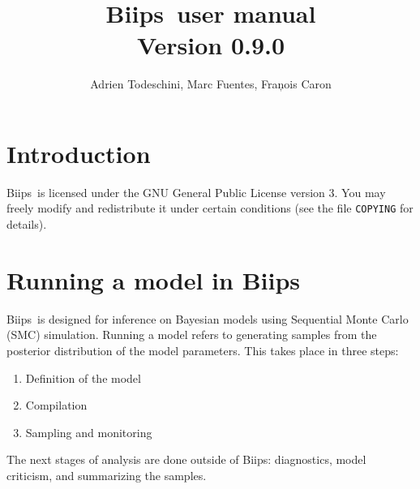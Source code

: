 \documentclass[11pt, a4paper, titlepage]{report}
\newcommand{\biips}{\textsf{Biips}}
\newcommand{\release}{0.9.0}
\newcommand{\JAGS}{\textsf{JAGS}}
\newcommand{\rjags}{\textsf{rjags}}
\newcommand{\OpenBUGS}{\textsf{OpenBUGS}}
\newcommand{\R}{\textsf{R}}
\newcommand{\CODA}{\textsf{coda}}
\begin{document}
\title{\biips\ user manual\\Version \release}
\author{Adrien Todeschini, Marc Fuentes, Fran\c{}ois Caron}

\maketitle

\tableofcontents

\chapter{Introduction}

% 

\biips\ is licensed under the GNU General Public License
version 3. You may freely modify and redistribute it under certain
conditions (see the file \texttt{COPYING} for details).

\chapter{Running a model in \biips}

\biips\ is designed for inference on Bayesian models using Sequential
Monte Carlo (SMC) simulation.  Running a model refers to generating
samples from the posterior distribution of the model parameters.  This
takes place in three steps:
\begin{enumerate}
\item Definition of the model
\item Compilation
\item Sampling and monitoring
\end{enumerate}
The next stages of analysis are done outside of \biips: diagnostics,
model criticism, and summarizing the samples.
\end{document}
